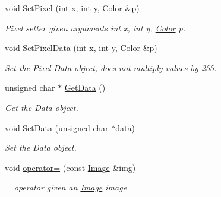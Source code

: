 \begin{DoxyCompactItemize}
\mbox{\label{classImage_a88e6e6e7cbe530c84c17a342fa2eaf40}} 
void \hyperlink{classImage_a88e6e6e7cbe530c84c17a342fa2eaf40}{Set\+Pixel} (int x, int y, \hyperlink{classColor}{Color} \&p)
\begin{DoxyCompactList}\small\item\em Pixel setter given arguments int x, int y, \hyperlink{classColor}{Color} p. \end{DoxyCompactList}\item 
void \hyperlink{classImage_a558cfcb26f9f8abc82c32d85a25332f7}{Set\+Pixel\+Data} (int x, int y, \hyperlink{classColor}{Color} \&p)
\begin{DoxyCompactList}\small\item\em Set the Pixel Data object, does not multiply values by 255. \end{DoxyCompactList}\item 
unsigned char $\ast$ \hyperlink{classImage_a6337e9b91fb0aeb0b482d7e933543608}{Get\+Data} ()
\begin{DoxyCompactList}\small\item\em Get the Data object. \end{DoxyCompactList}\item 
void \hyperlink{classImage_a5fab96b8b5e873488b72185639790c92}{Set\+Data} (unsigned char $\ast$data)
\begin{DoxyCompactList}\small\item\em Set the Data object. \end{DoxyCompactList}\item 
\mbox{\label{classImage_a4da7f72e4063bd0764caa635c0e0aaae}} 
void \hyperlink{classImage_a4da7f72e4063bd0764caa635c0e0aaae}{operator=} (const \hyperlink{classImage}{Image} \&img)
\begin{DoxyCompactList}\small\item\em = operator given an \hyperlink{classImage}{Image} image \end{DoxyCompactList}\end{DoxyCompactItemize}
